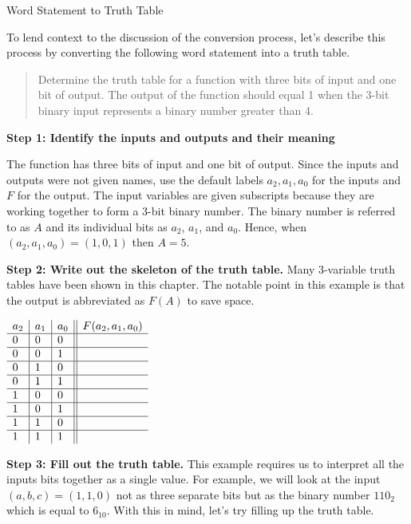 \begin{process}{Word Statement to Truth Table}
\label{process:representationWStoTT}

To lend context to the discussion of the conversion process, let's describe this
process by converting the following word statement into a truth table.

\begin{quote}
Determine the truth table for a function with three bits of input and
one bit of output.  The output of the function should equal 1 when
the 3-bit binary input represents a binary number greater than 4.
\end{quote}

\textbf{Step 1: Identify the inputs and outputs and their meaning}

The function has three bits of input and one bit of output.  
Since the inputs and outputs were not given names, use the default labels
$a_2,a_1,a_0$ for the inputs and $F$ for the output.  The input
variables are given subscripts because they are working together to 
form a 3-bit binary number.  The binary number is referred to as
$A$ and its individual bits as $a_2$, $a_1$, and $a_0$.  Hence,
when $(a_2,a_1,a_0) = (1,0,1)$ then $A=5$.

\textbf{Step 2: Write out the skeleton of the truth table.}
 Many 3-variable truth tables have been shown in this
chapter.  The notable point in this example is that the output is 
abbreviated as $F(A)$ to save space.

$\begin{array}[ht]{l|l|l||l}
a_2 & a_1 & a_0 & F(a_2, a_1, a_0)		\\ \hline
0   & 0   & 0   &		\\ \hline
0   & 0   & 1   &		\\ \hline
0   & 1   & 0   &		\\ \hline
0   & 1   & 1   &		\\ \hline
1   & 0   & 0   &		\\ \hline
1   & 0   & 1   &		\\ \hline
1   & 1   & 0   &		\\ \hline
1   & 1   & 1   &		\\ 
\end{array}$

\textbf{Step 3: Fill out the truth table.}
This example requires us to interpret all the inputs bits together as a single value.
For example, we will look at the input $(a,b,c) = (1,1,0)$ not as three separate bits
but as the binary number $110_2$ which is equal to $6_{10}$. With this in mind,
let's try filling up the truth table.


\end{process}
